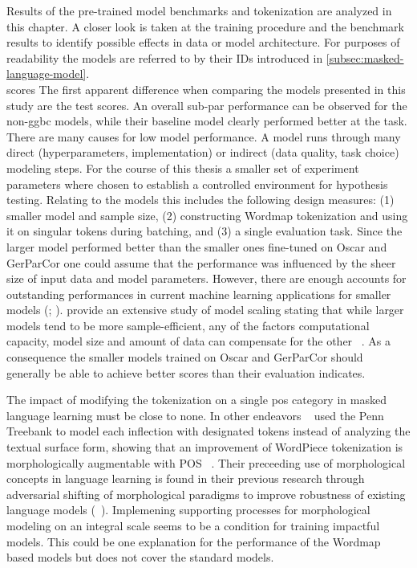 Results of the pre-trained model benchmarks and tokenization are analyzed in this chapter.
A closer look is taken at the training procedure and the benchmark results to identify possible effects in data or model architecture.
For purposes of readability the models are referred to by their IDs introduced in \autoref{subsec:masked-language-model}.\\

scores
The first apparent difference when comparing the models presented in this study are the test scores.
An overall sub-par performance can be observed for the non-ggbc models, while their baseline model clearly performed better at the task.
There are many causes for low model performance.
A model runs through many direct (hyperparameters, implementation) or indirect (data quality, task choice) modeling steps.
For the course of this thesis a smaller set of experiment parameters where chosen to establish a controlled environment for hypothesis testing.
Relating to the models this includes the following design measures: (1) smaller model and sample size, (2) constructing Wordmap tokenization and using it on singular tokens during batching, and (3) a single evaluation task.
Since the larger model performed better than the smaller ones fine-tuned on Oscar and GerParCor one could assume that the performance was influenced by the sheer size of input data and model parameters.
However, there are enough accounts for outstanding performances in current machine learning applications for smaller models (\textcite{smallmodelbigbang}; \textcite{fewshotTHREEpercent}).
\citeauthor{scalinglaws} provide an extensive study of model scaling stating that while larger models tend to be more sample-efficient, any of the factors computational capacity, model size and amount of data can compensate for the other ~\citeyear[3]{scalinglaws}.
As a consequence the smaller models trained on Oscar and GerParCor should generally be able to achieve better scores than their evaluation indicates.

The impact of modifying the tokenization on a single \ac{pos} category in masked language learning must be close to none.
In other endeavors ~\citeauthor{BITE} used the Penn Treebank to model each inflection with designated tokens instead of analyzing the textual surface form, showing that an improvement of WordPiece tokenization is morphologically augmentable with \ac{POS} ~\citeyear{BITE}.
Their preceeding use of morphological concepts in language learning is found in their previous research through adversarial shifting of morphological paradigms to improve robustness of existing language models (~\cite[2927]{adversarialmorphin}).
Implemening supporting processes for morphological modeling on an integral scale seems to be a condition for training impactful models.
This could be one explanation for the performance of the Wordmap based models but does not cover the standard models.

